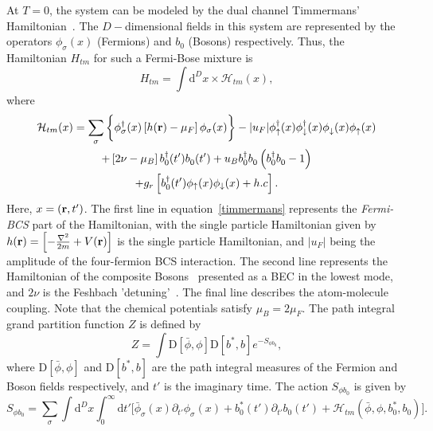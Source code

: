\documentclass[a4paper,10pt]{report}
\begin{document}
At $T=0$, the system can be modeled by the dual channel Timmermans' Hamiltonian~\cite{timmermans}. The $D-$dimensional fields in this system are represented by the operators  $\phi_\sigma(x)$ (Fermions) and $b_0$ (Bosons) respectively. Thus, the  Hamiltonian $H_{tm}$ for such a Fermi-Bose mixture is
\begin{equation}
 H_{tm} = \int{{\mathrm d}^Dx} \times {\mathcal H_{tm}} (x),
\end{equation}
where
\begin{multline}
\label{timmermans}
{\mathcal H_{tm}}(x) =  \sum_{\sigma} \bigg\{ \phi^\dagger_\sigma(x) \left[h({\bf r})-\mu_F\right]\phi_\sigma(x) \bigg \} - |u_F| \phi^\dagger_\uparrow(x)\phi^\dagger_\downarrow(x)\phi^{}_\downarrow(x)\phi^{}_\uparrow(x)\\ 
+\left[ 2\nu-\mu_B \right]b^\dagger_0(t')b^{ }_0(t')+ u_B b^\dagger_0b^{ }_0\left(b^\dagger_0b^{ }_0-1 \right)\\
+g_r\left[b^\dagger_0(t') \phi_\uparrow(x) \phi_\downarrow(x) + h.c\right].
\end{multline}
Here, $x=({\bf r},t')$. The first line in equation~\ref{timmermans} represents the \textit{Fermi-BCS} part of the Hamiltonian, with the single particle Hamiltonian given by $h({\bf r})=\left[ - \frac{\nabla^2}{2m}+V({\bf r}) \right]$ is the single particle Hamiltonian, and $|u_F|$ being the amplitude of the four-fermion BCS interaction. The second line represents the Hamiltonian of the composite Bosons~\cite{timmermans, huang:becbcs2} presented as a BEC in the lowest mode, and $2\nu$ is the Feshbach 'detuning'~\cite{timmermans}. The final line describes the atom-molecule coupling. Note that the chemical potentials satisfy $\mu_B=2\mu_F$. The path integral grand partition function $Z$ is defined by~\cite{huang:bcsbecgp,machida:dynamics}
\begin{equation}
\label{pathintegral}
 Z=\int{{\mathrm D}[\bar{\phi},\phi]{\mathrm D}[b^*,b]}e^{-S_{\phi b^{ }_0}},
\end{equation}
where ${\mathrm D}[\bar{\phi},\phi]$ and ${\mathrm D}[b^*,b]$ are the path integral measures of the Fermion and Boson fields respectively, and $t'$ is the imaginary time. The action $S_{\phi b^{ }_0}$ is given by
\begin{equation}
\label{pathintegral:action}
 S_{\phi b^{ }_0} = \sum_{\sigma} \int{{\mathrm d}^Dx} \int^\infty_0{{\mathrm d}t'} \bigg[ \bar{\phi}_{\sigma}(x)\partial_{t'} \phi_{\sigma}(x)+ b^*_0(t')\partial_{t'}b^{ }_0(t') + 
{\mathcal H_{tm}}(\bar{\phi},\phi,b^*_0,b^{ }_0)\bigg].
\end{equation}
\end{document}
